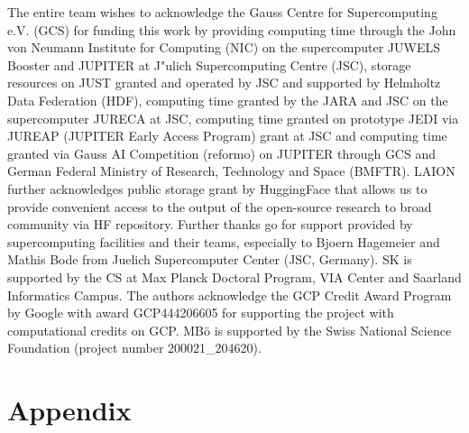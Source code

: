 \documentclass{article}
\begin{document}
The entire team wishes to acknowledge the Gauss Centre for Supercomputing e.V. (GCS) for funding this work by providing computing time through the John von Neumann Institute for Computing (NIC) on the supercomputer JUWELS Booster and JUPITER at J"ulich Supercomputing Centre (JSC), storage resources on JUST granted and operated by JSC and supported by Helmholtz Data Federation (HDF), computing time granted by the JARA and JSC on the supercomputer JURECA at JSC, computing time granted on prototype JEDI via JUREAP (JUPITER Early Access Program) grant at JSC and computing time granted via Gauss AI Competition (reformo) on JUPITER through GCS and German Federal Ministry of Research, Technology and Space (BMFTR). 
LAION further acknowledges public storage grant by HuggingFace that allows us to provide convenient access to the output of the open-source research to broad community via HF repository. 
Further thanks go for support provided by supercomputing facilities and their teams, especially to Bjoern Hagemeier and Mathis Bode from Juelich Supercomputer Center (JSC, Germany).
SK is supported by the CS at Max Planck Doctoral Program, VIA Center and Saarland Informatics Campus. The authors acknowledge the GCP Credit Award Program by Google with award GCP444206605 for supporting the project with computational credits on GCP.
MBö is supported by the Swiss National Science Foundation (project number 200021\_204620).

\newpage




\newpage

\part{Appendix}
\parttoc


\appendix
\startcontents[sections]
\clearpage



\newpage

\end{document}
